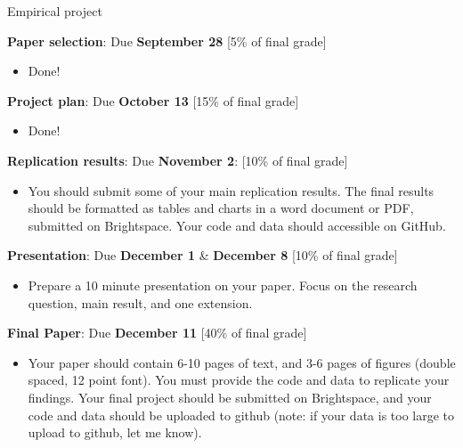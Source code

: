 \documentclass[compress, 8pt]{beamer}
\begin{document}
\begin{frame}{Empirical project}

\textbf{Paper selection}: Due \textbf{September 28} [5\% of final grade]
\begin{itemize}
    \item Done!
\end{itemize}

\textbf{Project plan}: Due \textbf{October 13} [15\% of final grade] 
\begin{itemize}
\item Done!
\end{itemize} 

\textbf{Replication results}: Due \textbf{November 2}: [10\% of final grade]
\begin{itemize}
\item You should submit some of your main replication results. The final results should be formatted as tables and charts in a word document or PDF, submitted on Brightspace. Your code and data should accessible on GitHub.
\end{itemize}

\textbf{Presentation}: Due \textbf{December 1} \& \textbf{December 8} [10\% of final grade]
\begin{itemize}
\item Prepare a 10 minute presentation on your paper. Focus on the research question, main result, and one extension. 
\end{itemize}

\textbf{Final Paper}: Due \textbf{December 11} [40\% of final grade]
\begin{itemize}
\item Your paper should contain 6-10 pages of text, and 3-6 pages of figures (double spaced, 12 point font).
You must provide the code and data to replicate your findings. 
Your final project should be submitted on Brightspace, and your code and data should be uploaded to github (note: if your data is too large to upload to github, let me know). 
\end{itemize}

\end{frame}
\end{document}
